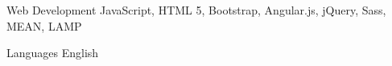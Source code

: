 
\begin{cvskills}

  \cvskill
    {Web Development}
    {JavaScript, HTML 5, Bootstrap, Angular.js, jQuery, Sass, MEAN, LAMP}


  \cvskill
    {Languages}
    {English}

\end{cvskills}

